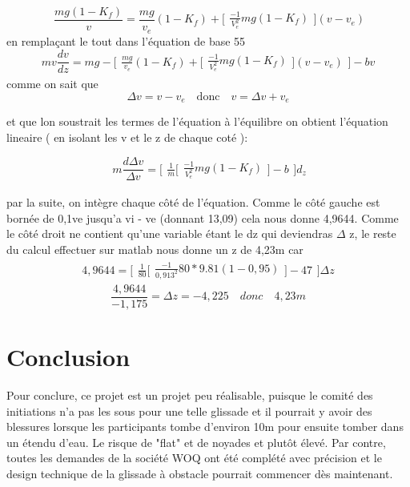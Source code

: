 \documentclass{article}
\begin{document}
\begin{equation}
\ \frac{mg ( 1- K_{f})}{v} = \frac{mg}{v_{e}}(1-K_{f})+
\Bigg[\begin{array}{cc}
    \frac{-1}{V_{e}^2}mg(1-K_{f})
    \end{array}\Bigg]
    (v-v_{e})
\end{equation}
en remplaçant le tout dans l'équation de base 55
\begin{equation}
mv \frac{dv}{dz} = mg - \Bigg[\begin{array}{cc}
\frac{mg}{v_{e}}(1-K_{f})+
\Bigg[\begin{array}{cc}
    \frac{-1}{V_{e}^2}mg(1-K_{f})
    \end{array}\Bigg]
    (v-v_{e}) \end{array}\Bigg] - bv
\end{equation}
comme on sait que
\begin{equation}
\Delta v = v - v_{e}  \quad  \textrm{donc} \quad    v = \Delta v+ v_{e}
\end{equation}

et que lon soustrait les termes de l'équation à l'équilibre on obtient l'équation lineaire  ( en isolant les v et le z de chaque coté ):

\begin{equation}
\ m \frac{d \Delta v}{\Delta v}= \Bigg[\begin{array}{cc} \frac{1}{m} \Bigg[\begin{array}{cc}
    \frac{-1}{V_{e}^2}mg(1-K_{f})
    \end{array}\Bigg]  - b\end{array}\Bigg] d_{z}
\end{equation}

par la suite, on intègre chaque côté de l'équation. Comme le côté gauche est bornée de 0,1ve jusqu'a vi - ve  (donnant 13,09)  cela nous donne 4,9644. Comme le côté droit ne contient qu'une variable étant le dz qui deviendras $\Delta$ z, le reste du calcul effectuer sur matlab nous donne un z de 4,23m car 
 \begin{equation}
 4,9644 = \Bigg[\begin{array}{cc} \frac{1}{80} \Bigg[\begin{array}{cc}
    \frac{-1}{0,913^2}80*9.81(1-0,95)
    \end{array}\Bigg]  - 47\end{array}\Bigg] \Delta z
 \end{equation}
 \begin{equation}
 \frac{4,9644}{ -1,175}= \Delta z = -4,225 \quad donc \quad 4,23 m
 \end{equation}
 
\section{Conclusion}
Pour conclure, ce projet est un projet peu réalisable, puisque le comité des initiations n'a pas les sous pour une telle glissade et il pourrait y avoir des blessures lorsque les participants tombe d'environ 10m pour ensuite tomber dans un étendu d'eau. Le risque de "flat" et de noyades et plutôt élevé. Par contre, toutes les demandes de la société WOQ ont été complété avec précision et le design technique de la glissade à obstacle pourrait commencer dès maintenant.
\end{document}
